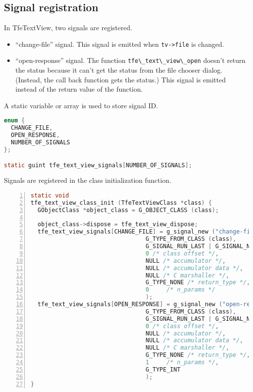 \subsection{Signal registration}\label{signal-registration}

In TfeTextView, two signals are registered.

\begin{itemize}
\tightlist
\item
  ``change-file'' signal. This signal is emitted when
  \passthrough{\lstinline!tv->file!} is changed.
\item
  ``open-response'' signal. The function
  \passthrough{\lstinline!tfe\_text\_view\_open!} doesn't return the
  status because it can't get the status from the file chooser dialog.
  (Instead, the call back function gets the status.) This signal is
  emitted instead of the return value of the function.
\end{itemize}

A static variable or array is used to store signal ID.

\begin{lstlisting}[language=C]
enum {
  CHANGE_FILE,
  OPEN_RESPONSE,
  NUMBER_OF_SIGNALS
};

static guint tfe_text_view_signals[NUMBER_OF_SIGNALS];
\end{lstlisting}

Signals are registered in the class initialization function.

\begin{lstlisting}[language=C, numbers=left]
static void
tfe_text_view_class_init (TfeTextViewClass *class) {
  GObjectClass *object_class = G_OBJECT_CLASS (class);

  object_class->dispose = tfe_text_view_dispose;
  tfe_text_view_signals[CHANGE_FILE] = g_signal_new ("change-file",
                                 G_TYPE_FROM_CLASS (class),
                                 G_SIGNAL_RUN_LAST | G_SIGNAL_NO_RECURSE | G_SIGNAL_NO_HOOKS,
                                 0 /* class offset */,
                                 NULL /* accumulator */,
                                 NULL /* accumulator data */,
                                 NULL /* C marshaller */,
                                 G_TYPE_NONE /* return_type */,
                                 0     /* n_params */
                                 );
  tfe_text_view_signals[OPEN_RESPONSE] = g_signal_new ("open-response",
                                 G_TYPE_FROM_CLASS (class),
                                 G_SIGNAL_RUN_LAST | G_SIGNAL_NO_RECURSE | G_SIGNAL_NO_HOOKS,
                                 0 /* class offset */,
                                 NULL /* accumulator */,
                                 NULL /* accumulator data */,
                                 NULL /* C marshaller */,
                                 G_TYPE_NONE /* return_type */,
                                 1     /* n_params */,
                                 G_TYPE_INT
                                 );
}
\end{lstlisting}

